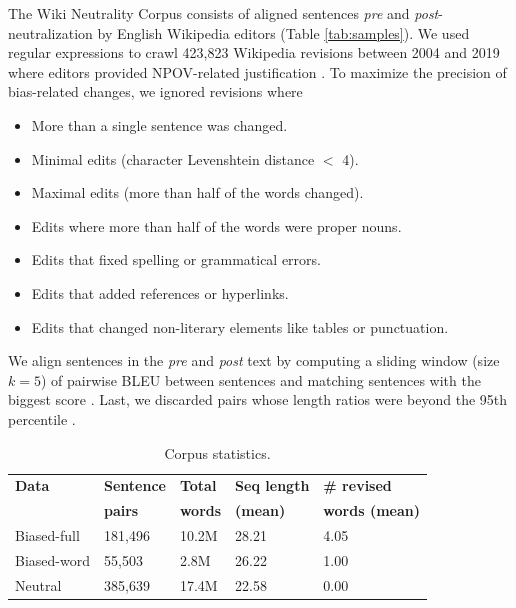 The Wiki Neutrality Corpus  consists of aligned sentences \emph{pre} and \emph{post}-neutralization by English Wikipedia editors (Table \ref{tab:samples}). 
We used regular expressions to crawl 423,823 Wikipedia revisions between 2004 and  2019  where  editors  provided  NPOV-related  justification \cite{zanzotto2010expanding,recasens2013linguistic,yang2017identifying}. To maximize the precision of bias-related changes, we ignored revisions where
\begin{itemize}[noitemsep]
    \item More than a single sentence was changed.
    \item Minimal edits (character Levenshtein distance $<$ 4).
    \item Maximal edits (more than half of the words changed).
    \item Edits where more than half of the words were proper nouns.
    \item Edits that fixed spelling or grammatical errors.
    \item Edits that added references or hyperlinks.
    \item Edits that changed non-literary elements like tables or punctuation.
\end{itemize}

We align sentences in the \emph{pre} and \emph{post} text by computing a sliding window (size $k = 5$) of pairwise BLEU \cite{papineni2002bleu} between sentences and matching sentences with the biggest score \cite{faruqui2018wikiatomicedits,tiedemann2008synchronizing}. Last, we discarded pairs whose length ratios were beyond the 95th percentile \cite{pryzant2017jesc}.



\begin{table}[]
\centering
\small
\begin{tabular}{l|llll}
\textbf{Data}          & \textbf{Sentence} & \textbf{Total} & \textbf{Seq length} & \textbf{\# revised} \vspace{-0.1cm}\\ & \textbf{pairs} & \textbf{words} & \textbf{(mean)} & \textbf{words (mean)} \\ \hline \hline
Biased-full & 181,496         & 10.2M         & 28.21                  & 4.05                     \\
Biased-word & 55,503          & 2.8M          & 26.22                  & 1.00                     \\
Neutral       & 385,639         & 17.4M         & 22.58                  & 0.00                    
\end{tabular}
\caption{Corpus statistics.}
\label{table:corpus-stats}
\end{table}



